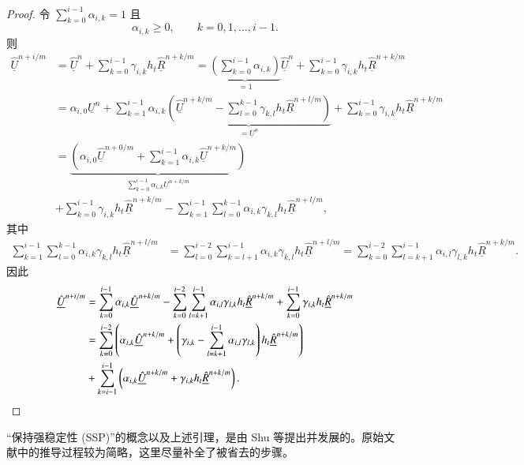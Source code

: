 \begin{proof}
令 $\sum_{k=0}^{i-1}\alpha_{i,k}=1$ 且
\begin{equation}
\alpha_{i,k}\ge0,\qquad k=0,1,\dots,i-1.
\end{equation}
则
\begin{equation}
\begin{aligned}\underline{\hat{U}}^{n+i/m} & =\underline{\hat{U}}^{n}+\sum_{k=0}^{i-1}\gamma_{i,k}h_{t}\underline{\hat{R}}^{n+k/m}=\underbrace{\left(\sum_{k=0}^{i-1}\alpha_{i,k}\right)}_{=1}\underline{\hat{U}}^{n}+\sum_{k=0}^{i-1}\gamma_{i,k}h_{t}\underline{\hat{R}}^{n+k/m}\\
 & =\alpha_{i,0}\underline{U}^{n}+\sum_{k=1}^{i-1}\alpha_{i,k}\underbrace{\left(\underline{\hat{U}}^{n+k/m}-\sum_{l=0}^{k-1}\gamma_{k,l}h_{t}\underline{\hat{R}}^{n+l/m}\right)}_{=\underline{U}^{n}}+\sum_{k=0}^{i-1}\gamma_{i,k}h_{t}\underline{\hat{R}}^{n+k/m}\\
 & =\underbrace{\left(\alpha_{i,0}\underline{\hat{U}}^{n+0/m}+\sum_{k=1}^{i-1}\alpha_{i,k}\underline{\hat{U}}^{n+k/m}\right)}_{\sum_{k=0}^{i-1}\alpha_{i,k}\underline{U}^{n+k/m}}\\
 & +\sum_{k=0}^{i-1}\gamma_{i,k}h_{t}\underline{\hat{R}}^{n+k/m}-\sum_{k=1}^{i-1}\sum_{l=0}^{k-1}\alpha_{i,k}\gamma_{k,l}h_{t}\underline{\hat{R}}^{n+l/m},
\end{aligned}
\end{equation}
其中
\begin{equation}
\begin{aligned}\sum_{k=1}^{i-1}\sum_{l=0}^{k-1}\alpha_{i,k}\gamma_{k,l}h_{t}\underline{\hat{R}}^{n+l/m} & =\sum_{l=0}^{i-2}\sum_{k=l+1}^{i-1}\alpha_{i,k}\gamma_{k,l}h_{t}\underline{\hat{R}}^{n+l/m}=\sum_{k=0}^{i-2}\sum_{l=k+1}^{i-1}\alpha_{i,l}\gamma_{l,k}h_{t}\underline{\hat{R}}^{n+k/m}.\end{aligned}
\end{equation}
因此
\begin{equation}
\begin{aligned}\underline{\hat{U}}^{n+i/m} & =\sum_{k=0}^{i-1}\alpha_{i,k}\underline{\hat{U}}^{n+k/m}-\sum_{k=0}^{i-2}\sum_{l=k+1}^{i-1}\alpha_{i,l}\gamma_{l,k}h_{t}\underline{\hat{R}}^{n+k/m}+\sum_{k=0}^{i-1}\gamma_{i,k}h_{t}\underline{\hat{R}}^{n+k/m}\\
 & =\sum_{k=0}^{i-2}\left(\alpha_{i,k}\underline{\hat{U}}^{n+k/m}+\left(\gamma_{i,k}-\sum_{l=k+1}^{i-1}\alpha_{i,l}\gamma_{l,k}\right)h_{t}\underline{\hat{R}}^{n+k/m}\right)\\
 & +\sum_{k=i-1}^{i-1}\left(\alpha_{i,k}\underline{\hat{U}}^{n+k/m}+\gamma_{i,k}h_{t}\underline{\hat{R}}^{n+k/m}\right).\qedhere
\end{aligned}
\end{equation}
\end{proof}
%
“保持强稳定性 (SSP)”的概念以及上述引理，是由 Shu 等提出并发展的。原始文献中的推导过程较为简略，这里尽量补全了被省去的步骤。

